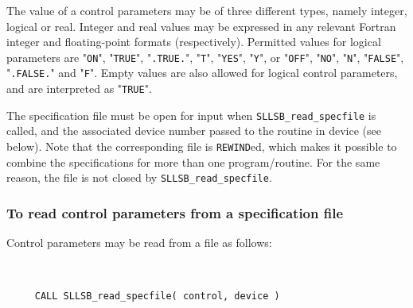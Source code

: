 \documentclass{galahad}
\newcommand{\packagename}{SLLSB}
\begin{document}
The value of a control parameters may be of three different types, namely
integer, logical or real.
Integer and real values may be expressed in any relevant Fortran integer and
floating-point formats (respectively). Permitted values for logical
parameters are "{\tt ON}", "{\tt TRUE}", "{\tt .TRUE.}", "{\tt T}",
"{\tt YES}", "{\tt Y}", or "{\tt OFF}", "{\tt NO}",
"{\tt N}", "{\tt FALSE}", "{\tt .FALSE.}" and "{\tt F}".
Empty values are also allowed for
logical control parameters, and are interpreted as "{\tt TRUE}".

The specification file must be open for
input when {\tt \packagename\_read\_specfile}
is called, and the associated device number
passed to the routine in device (see below).
Note that the corresponding
file is {\tt REWIND}ed, which makes it possible to combine the specifications
for more than one program/routine.  For the same reason, the file is not
closed by {\tt \packagename\_read\_specfile}.

\subsubsection{To read control parameters from a specification file}
\label{readspec}

Control parameters may be read from a file as follows:
\hskip0.5in

\def\baselinestretch{0.8}
{\tt
\begin{verbatim}
     CALL SLLSB_read_specfile( control, device )
\end{verbatim}
}
\def\baselinestretch{1.0}
\end{document}
